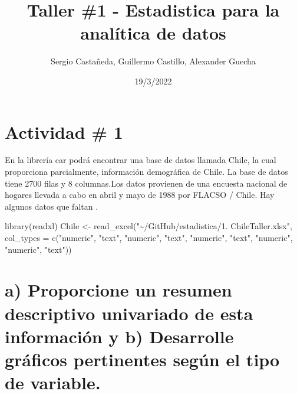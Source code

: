 \documentclass[
]{article}
\title{Taller \#1 - Estadistica para la analítica de datos}
\author{Sergio Castañeda, Guillermo Castillo, Alexander Guecha}
\date{19/3/2022}
\newenvironment{Shaded}{\begin{snugshade}}{\end{snugshade}}
\newcommand{\AttributeTok}[1]{\textcolor[rgb]{0.77,0.63,0.00}{#1}}
\newcommand{\FunctionTok}[1]{\textcolor[rgb]{0.00,0.00,0.00}{#1}}
\newcommand{\NormalTok}[1]{#1}
\newcommand{\OtherTok}[1]{\textcolor[rgb]{0.56,0.35,0.01}{#1}}
\newcommand{\SpecialCharTok}[1]{\textcolor[rgb]{0.00,0.00,0.00}{#1}}
\newcommand{\StringTok}[1]{\textcolor[rgb]{0.31,0.60,0.02}{#1}}
\begin{document}
\maketitle

\begin{Shaded}
\end{Shaded}

\hypertarget{actividad-1}{%
\section{Actividad \# 1}\label{actividad-1}}

En la librería car podrá encontrar una base de datos llamada Chile, la
cual proporciona parcialmente, información demográfica de Chile. La base
de datos tiene 2700 filas y 8 columnas.Los datos provienen de una
encuesta nacional de hogares llevada a cabo en abril y mayo de 1988 por
FLACSO / Chile. Hay algunos datos que faltan .

\begin{Shaded}
\begin{Highlighting}[]
\FunctionTok{library}\NormalTok{(readxl)}
\NormalTok{Chile }\OtherTok{\textless{}{-}} \FunctionTok{read\_excel}\NormalTok{(}\StringTok{"\textasciitilde{}/GitHub/estadistica/1. ChileTaller.xlsx"}\NormalTok{, }
    \AttributeTok{col\_types =} \FunctionTok{c}\NormalTok{(}\StringTok{"numeric"}\NormalTok{, }\StringTok{"text"}\NormalTok{, }\StringTok{"numeric"}\NormalTok{, }
        \StringTok{"text"}\NormalTok{, }\StringTok{"numeric"}\NormalTok{, }\StringTok{"text"}\NormalTok{, }\StringTok{"numeric"}\NormalTok{, }
        \StringTok{"numeric"}\NormalTok{, }\StringTok{"text"}\NormalTok{))}
\end{Highlighting}
\end{Shaded}

\hypertarget{a-proporcione-un-resumen-descriptivo-univariado-de-esta-informaciuxf3n-y-b-desarrolle-gruxe1ficos-pertinentes-seguxfan-el-tipo-de-variable.}{%
\section{a) Proporcione un resumen descriptivo univariado de esta
información y b) Desarrolle gráficos pertinentes según el tipo de
variable.}\label{a-proporcione-un-resumen-descriptivo-univariado-de-esta-informaciuxf3n-y-b-desarrolle-gruxe1ficos-pertinentes-seguxfan-el-tipo-de-variable.}}
\end{document}
